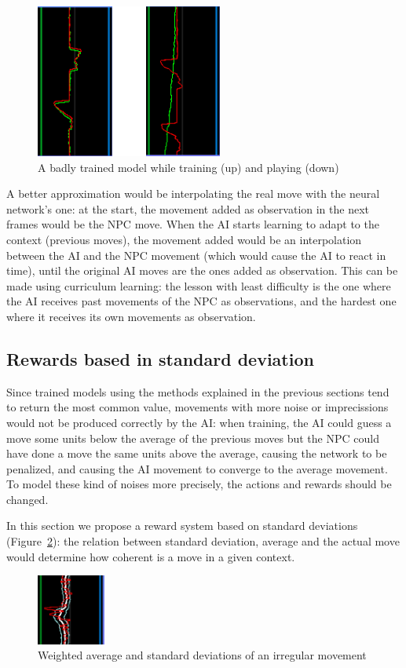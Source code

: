 \begin{figure}[h]
  \centering
		\includegraphics[width=.5\textwidth]{img/graphsMemory.png}
  \caption{A badly trained model while training (up) and playing (down)}
  \label{fig:graphMem}
\end{figure}

A better approximation would be interpolating the real move with the neural network's one: at the start, the movement added as observation in the next frames would be the NPC move. When the AI starts learning to adapt to the context (previous moves), the movement added would be an interpolation between the AI and the NPC movement (which would cause the AI to react in time), until the original AI moves are the ones added as observation. This can be made using curriculum learning: the lesson with least difficulty is the one where the AI receives past movements of the NPC as observations, and the hardest one where it receives its own movements as observation.

\subsection{Rewards based in standard deviation}
\label{sec:stdrew}

Since trained models using the methods explained in the previous sections tend to return the most common value, movements with more noise or imprecissions would not be produced correctly by the AI: when training, the AI could guess a move some units below the average of the previous moves but the NPC could have done a move the same units above the average, causing the network to be penalized, and causing the AI movement to converge to the average movement. To model these kind of noises more precisely, the actions and rewards should be changed.

In this section we propose a reward system based on standard deviations (Figure~\ref{fig:stdexample}): the relation between standard deviation, average and the actual move would determine how coherent is a move in a given context.
\begin{figure}
    \centering
    \includegraphics[width=0.2\textwidth]{img/graphSTD.png}
		\caption{Weighted average and standard deviations of an irregular movement}
		\label{fig:stdexample}
\end{figure}

